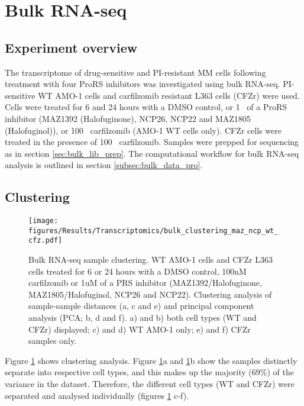 \clearpage

\section{Bulk RNA-seq}

\subsection{Experiment overview}
The transcriptome of drug-sensitive and PI-resistant MM cells following treatment with four ProRS inhibitors was investigated using bulk RNA-seq.
PI-sensitive WT AMO-1 cells and carfilzomib resistant L363 cells (CFZr) were used.
Cells were treated for 6 and 24 hours with a DMSO control, or 1\si{\micro\Molar} of a ProRS inhibitor (MAZ1392 (Halofuginone), NCP26, NCP22 and MAZ1805 (Halofuginol)), or 100\si{\nano\Molar} carfilzomib (AMO-1 WT cells only).
CFZr cells were treated in the presence of 100\si{\nano\Molar} carfilzomib.
Samples were prepped for sequencing as in section \ref{sec:bulk_lib_prep}.
The computational workflow for bulk RNA-seq analysis is outlined in section \ref{subsec:bulk_data_pro}.

\subsection{Clustering}

\begin{figure}[p]
\centering
\texttt{[image: figures/Results/Transcriptomics/bulk\_clustering\_maz\_ncp\_wt\_cfz.pdf]}
\caption[Bulk RNA-seq sample clustering]{Bulk RNA-seq sample clustering.
WT AMO-1 cells and CFZr L363 cells treated for 6 or 24 hours with a DMSO control, 100nM carfilzomib or 1uM of a PRS inhibitor (MAZ1392/Halofuginone, MAZ1805/Halofuginol, NCP26 and NCP22).
Clustering analysis of sample-sample distances (a, c and e) and principal component analysis (PCA; b, d and f).
a) and b) both cell types (WT and CFZr) displayed; c) and d) WT AMO-1 only; e) and f) CFZr samples only.
}
\label{fig:clustering_bulk}\end{figure}

Figure \ref{fig:clustering_bulk} shows clustering analysis.
Figure \ref{fig:clustering_bulk}a and \ref{fig:clustering_bulk}b show the samples distinctly separate into respective cell types, and this makes up the majority (69\%) of the variance in the dataset.
Therefore, the different cell types (WT and CFZr) were separated and analysed individually (figures \ref{fig:clustering_bulk} c-f).

